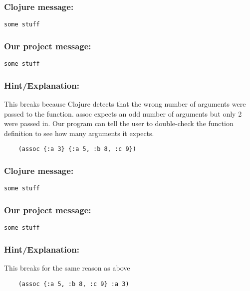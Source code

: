 \documentclass[12pt]{article}
\begin{document}
{\addtolength{\leftskip}{10mm}

	\subsubsection*{Clojure message:}
	
	\verb|some stuff|

	\subsubsection*{Our project message:}
	
	\verb|some stuff|
	
	\subsubsection*{Hint/Explanation:}
	
This breaks because Clojure detects that the wrong number of arguments were passed to the function. assoc expects an odd number of arguments but only 2 were passed in. Our program can tell the user to double-check the function definition to see how many arguments it expects.
	
}

\begin{verbatim}
	(assoc {:a 3} {:a 5, :b 8, :c 9})
\end{verbatim}

{\addtolength{\leftskip}{10mm}

	\subsubsection*{Clojure message:}
	
	\verb|some stuff|

	\subsubsection*{Our project message:}
	
	\verb|some stuff|
	
	\subsubsection*{Hint/Explanation:}
	
This breaks for the same reason as above

}

\begin{verbatim}
	(assoc {:a 5, :b 8, :c 9} :a 3)
\end{verbatim}
\end{document}
